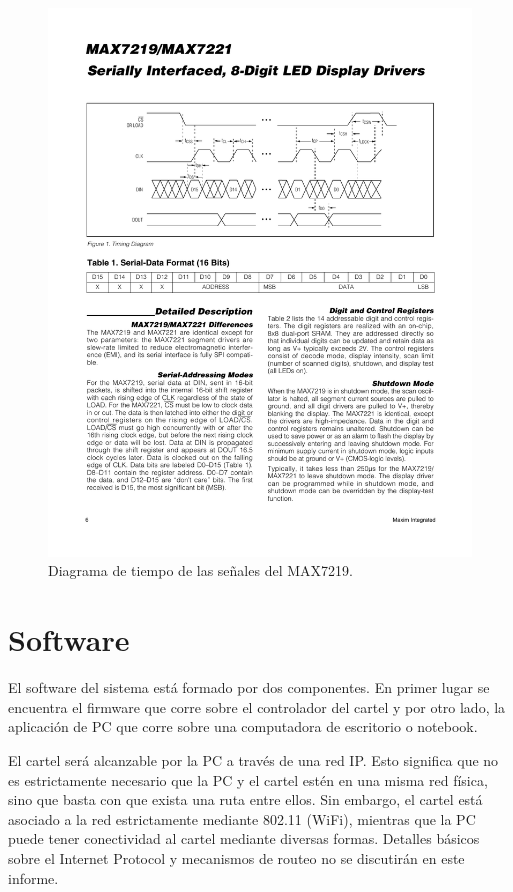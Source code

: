 \begin{figure}[ht!]
	\centering
	\begin{center}
		\includegraphics[width=\textwidth]{imagenes/hw/timingDiagram.pdf}
		\caption{Diagrama de tiempo de las señales del MAX7219.}
		\label{fig:spi-timing-diagram}
	\end{center}
\end{figure}


\pagebreak
\section{Software}\label{sec:sw}
El software del sistema está formado por dos componentes. En primer lugar se encuentra el firmware que corre sobre el controlador del cartel y por otro lado, la aplicación de PC que corre sobre una computadora de escritorio o notebook.

El cartel será alcanzable por la PC a través de una red IP. Esto significa que no es estrictamente necesario que la PC y el cartel estén en una misma red física, sino que basta con que exista una ruta entre ellos. Sin embargo, el cartel está asociado a la red estrictamente mediante 802.11 (WiFi), mientras que la PC puede tener conectividad al cartel mediante diversas formas. Detalles básicos sobre el Internet Protocol y mecanismos de routeo no se discutirán en este informe.

